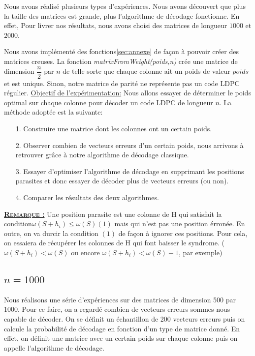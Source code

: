 \documentclass[french,nochapter,11pt]{rapportUB}
\begin{document}
Nous avons réalisé plusieurs types d'expériences. Nous avons découvert que plus la taille des matrices est grande, 
plus l'algorithme de décodage fonctionne. En effet, Pour livrer nos résultats, nous avons choisi des matrices de longueur 
$1000$ et $2000$.

Nous avons implémenté des fonctions\ref{sec:annexe} de façon à pouvoir créer des matrices creuses.
La fonction \textit{matrixFromWeight(poids,n)} crée une matrice de dimension $\dfrac{n}{2}$ par $n$ de telle sorte que 
chaque colonne ait un poids de valeur $poids$ et est unique. Sinon, notre matrice de parité ne représente pas un code LDPC régulier.\vspace{0.4cm}\newline
\underline{Objectif de l'expérimentation:} Nous allons essayer de déterminer le poids optimal sur chaque colonne pour décoder un code 
LDPC de longueur $n$.\vspace{0.4cm}\newline
La méthode adoptée est la suivante:
\begin{enumerate}
  \item[1.] Construire une matrice dont les colonnes ont un certain poids.
  \item[2.] Observer combien de vecteurs erreurs d'un certain poids, nous arrivons à retrouver grâce à notre algorithme de décodage classique.
  \item[3.] Essayer d'optimiser l'algorithme de décodage en supprimant les positions parasites et donc essayer de décoder plus de vecteurs erreurs (ou non).
  \item[4.] Comparer les résultats des deux algorithmes.
\end{enumerate}

\textsc{\textbf{\underline{Remarque :}}} Une position parasite est une colonne de H qui satisfait la condition\newline $\omega(S + h_{i}) \le \omega(S)(1)$ mais qui n'est pas une 
position érronée. En outre, on va durcir la condition $(1)$ de façon à ignorer ces positions. Pour cela, on essaiera de récupérer les colonnes de H qui font baisser le
syndrome. ($\omega(S + h_{i}) < \omega(S)$ ou encore $\omega(S + h_{i}) < \omega(S) - 1$, par exemple)

\subsection{$n = 1000$}
Nous réalisons une série d'expériences sur des matrices de dimension 500 par 1000. Pour ce faire, on a regardé combien de vecteurs erreurs
sommes-nous capable de décoder. On se définit un échantillon de 200 vecteurs erreurs puis on calcule la probabilité de décodage en fonction d'un type de matrice donné.
En effet, on définit une matrice avec un certain poids sur chaque colonne puis on appelle l'algorithme de décodage.\vspace{0.4cm}\newline
\end{document}
